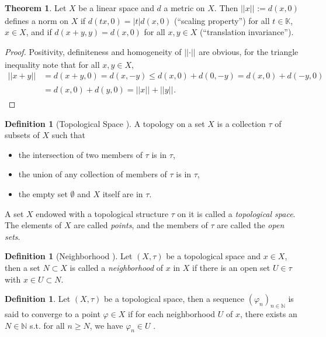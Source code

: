 \documentclass[12pt, a4paper]{article}
\numberwithin{equation}{section}
\theoremstyle{definition}
\theoremstyle{definition}
\newtheorem{defn}[thm]{Definition} %
\newtheorem{theorem}[thm]{Theorem}
\newcommand{\norm}[2]{\left\vert\left\vert #1 \right\vert\right\vert_{#2}}
\newcommand{\abs}[1]{\left\vert #1 \right\vert}
\newcommand{\seq}[1][\varphi]{\left( #1 \right)_{n \in \mathbb{N}}}
\begin{document}
	\begin{theorem}
		Let $X$ be a linear space and $d$ a metric on $X$. Then $\norm{x}{} := d(x, 0)$ defines a norm on $X$ if $d(tx, 0) = \abs{t}d(x, 0)$ (\enquote{scaling property}) for all $t\in\mathbb K$, $x\in X$, and if $d(x + y, y) = d(x, 0)$ for all $x, y\in X$ (\enquote{translation invariance}).
	\end{theorem}

	\begin{proof}
		Positivity, definiteness and homogeneity of $\norm{\cdot}{}$ are obvious, for the triangle inequality note that for all $x, y\in X$,
		\begin{align*}
			\norm{x + y}{} &= d(x + y, 0) = d(x, -y) \leq d(x, 0) + d(0, -y) = d(x, 0) + d(-y, 0) 
			\\ &= d(x, 0) + d(y, 0) = \norm{x}{} + \norm{y}{}.
		\end{align*}
	\end{proof}
	
	\begin{defn}[Topological Space \cite{topology-singh}]
		A topology on a set $X$ is a collection $\tau$ of subsets of $X$ such that 
		\begin{itemize}
			\item the intersection of two members of $\tau$ is in $\tau$, 
			\item the union of any collection of members of $\tau$ is in $\tau$, 
			\item the empty set $\emptyset$ and $X$ itself are in $\tau$.
		\end{itemize}
		A set $X$ endowed with a topological structure $\tau$ on it is called a \textit{topological space}. The elements of $X$ are called \textit{points}, and the members of $\tau$ are called the \textit{open sets}. 
	\end{defn} 
	
	\begin{defn}[Neighborhood \cite{topology-singh}]
		Let $(X, \tau)$ be a topological space and $x\in X$, then a set $N\subset X$ is called a \textit{neighborhood} of $x$ in $X$ if there is an open set $U\in\tau$ with $x\in U\subset N$.
	\end{defn}
	
	\begin{defn}
		Let $(X, \tau)$ be a topological space, then a sequence $\seq[\varphi_n]$ is said to converge to a point $\varphi\in X$ if for each neighborhood $U$ of $x$, there exists an $N\in\mathbb N$ s.t. for all $n\geq N$, we have $\varphi_n\in U$ \cite{289740}.
	\end{defn}
	
\end{document}
